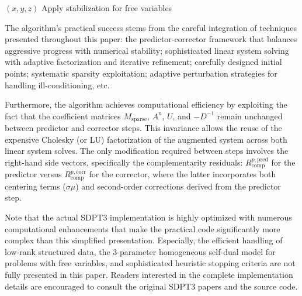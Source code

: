 \begin{algorithm}
\begin{algorithmic}[1]
    \STATE 
        \RETURN $(x, y, z)$
    \ENDIF
    \STATE Apply stabilization for free variables
\ENDFOR
\end{algorithmic}
\end{algorithm}

The algorithm's practical success stems from the careful integration of techniques presented throughout this paper: the predictor-corrector framework that balances aggressive progress with numerical stability; sophisticated linear system solving with adaptive factorization and iterative refinement; carefully designed initial points; systematic sparsity exploitation; adaptive perturbation strategies for handling ill-conditioning, etc.

Furthermore, the algorithm achieves computational efficiency by exploiting the fact that the coefficient matrices $M_{\text{sparse}}$, $A^{\text{u}}$, $U$, and $-D^{-1}$ remain unchanged between predictor and corrector steps. This invariance allows the reuse of the expensive Cholesky (or LU) factorization of the augmented system across both linear system solves. The only modification required between steps involves the right-hand side vectors, specifically the complementarity residuals: $R_{\text{comp}}^{p,\text{pred}}$ for the predictor versus $R_{\text{comp}}^{p,\text{corr}}$ for the corrector, where the latter incorporates both centering terms ($\sigma \mu$) and second-order corrections derived from the predictor step.

Note that the actual SDPT3 implementation is highly optimized with numerous computational enhancements that make the practical code significantly more complex than this simplified presentation. 
Especially, the efficient handling of low-rank structured data, the 3-parameter homogeneous self-dual model for problems with free variables, and sophisticated heuristic stopping criteria are not fully presented in this paper. 
Readers interested in the complete implementation details are encouraged to consult the original SDPT3 papers \cite{toh1999,Toh2012,tutuncu2003} and the source code.